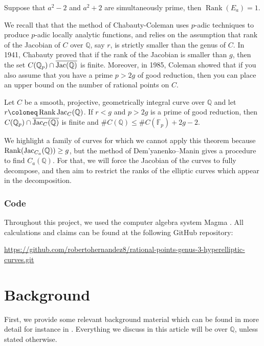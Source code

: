 \documentclass{article}
\newenvironment{manualtheorem}[1]{%
  \IfBlankTF{#1}
    {\renewcommand{\themanualtheoreminner}{\unskip}}
    {\renewcommand\themanualtheoreminner{#1}}%
  \manualtheoreminner
}{\endmanualtheoreminner}
\newcommand{\Q}{\mathbb{Q}}
\theoremstyle{definition}
\newcommand{\F}{\mathbb{F}}
\newcommand{\Jac}{\textnormal{Jac}}
\DeclareMathOperator{\Rank}{Rank}
\begin{document}
\begin{manualtheorem}{4.1}
    Suppose that $a^2-2$ and $a^2 + 2$ are simultaneously prime, then $\Rank(E_a) = 1$.
\end{manualtheorem}

\noindent We recall that that the method of Chabauty-Coleman uses $p$-adic techniques to produce $p$-adic locally analytic functions, and relies on the assumption that rank of the Jacobian of $C$ over $\Q$, say $r$, is strictly smaller than the genus of $C$. In 1941, Chabauty \cite{chabauty1941points} proved that if the rank of the Jacobian is smaller than $g$, then the set $C(\Q_p) \cap \overline{\Jac(\Q)}$ is finite. Moreover, in 1985, Coleman \cite{coleman1985} showed that if you also assume that you have a prime $p > 2g$ of good reduction, then you can place an upper bound on the number of rational points on $C$.

\begin{manualtheorem}{}[Chabauty-Coleman]
    Let $C$ be a smooth, projective, geometrically integral curve over $\Q$ and let $r \coloneq \Rank \Jac_C(\Q)$. If $r < g$ and $p > 2g$ is a prime of good reduction, then $C(\Q_p) \cap \overline{\Jac_C(\Q)}$ is finite and $\#C(\Q) \leq \#C(\F_p) + 2g - 2$.
\end{manualtheorem}

\noindent We highlight a family of curves for which we cannot apply this theorem because $\Rank(\Jac_{C_a}(\Q)) \ge g$, but the method of Dem'yanenko--Manin gives a procedure to find $C_a(\Q)$. For that, we will force the Jacobian of the curves to fully decompose, and then aim to restrict the ranks of the elliptic curves which appear in the decomposition.

\subsubsection*{Code}
\noindent Throughout this project, we used the computer algebra system Magma \cite{bosma1997magma}. All calculations and claims can be found at the following GitHub repository: 

\begin{center}
    \href{https://github.com/robertohernandez8/rational-points-genus-3-hyperelliptic-curves.git}{https://github.com/robertohernandez8/rational-points-genus-3-hyperelliptic-curves.git}
\end{center} 

\section{Background}
\noindent First, we provide some relevant background material which can be found in more detail for instance in \cite{hindry2013diophantine}. Everything we discuss in this article will be over $\Q$, unless stated otherwise. 
\end{document}
